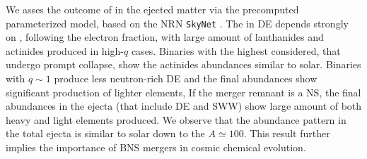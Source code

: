 We asses the outcome of \rproc{} \nuc{} in the ejected matter via the precomputed 
parameterized model, based on the \ac{NRN} \texttt{SkyNet} \citep{Lippuner:2015gwa}.
%
The \rproc{} in \ac{DE} depends strongly on \mr{}, following the electron fraction,
with large amount of lanthanides and actinides produced in high-$q$ cases.
Binaries with the highest \mr{} considered, that undergo prompt collapse, show the 
actinides abundances similar to solar.
Binaries with $q \sim 1$ produce less neutron-rich \ac{DE} and the 
final abundances show significant production of lighter elements,
If the merger remnant is a \ac{NS}, the final \rproc{} abundances in the ejecta 
(that include \ac{DE} and \ac{SWW}) show large amount 
of both heavy and light elements produced. 
We observe that the abundance pattern in the total ejecta 
is similar to solar down to the $A\simeq 100$.
This result further implies the importance of \ac{BNS} mergers in cosmic 
chemical evolution.

